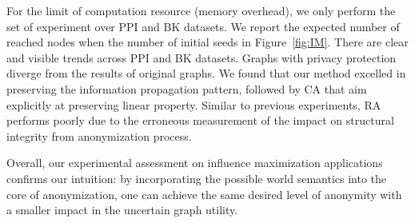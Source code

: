 For the limit of computation resource (memory overhead), we only perform the set of experiment over PPI and BK datasets. We report the expected number of reached nodes when the number of initial seeds in Figure~\ref{fig:IM}. 
There are clear and visible trends across PPI and BK datasets. 
Graphs with privacy protection diverge from the results of original graphs.
We found that our method {\methodName} excelled in preserving the information propagation pattern, followed by CA that aim explicitly at preserving linear property. Similar to previous experiments, RA performs poorly due to the erroneous measurement of the impact on structural integrity from anonymization process.  

Overall, our experimental assessment on influence maximization applications confirms our intuition: by incorporating the possible world semantics into the core of anonymization, one can achieve the same desired level of anonymity with a smaller impact in the uncertain graph utility.  